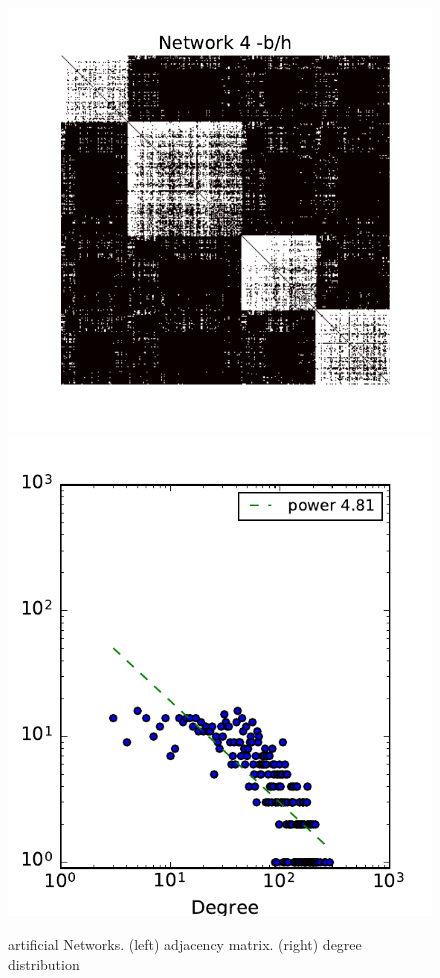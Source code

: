 \begin{figure}[h]
	\endminipage
	\vspace{-0.4cm}
	\includegraphics[scale=0.4]{img/g4}
	\endminipage
	\includegraphics[scale=0.4]{img/g4_d}
	\endminipage
	
	\caption{artificial Networks. (left) adjacency matrix. (right) degree distribution}
	\label{fig:synt_graph}
\end{figure}

